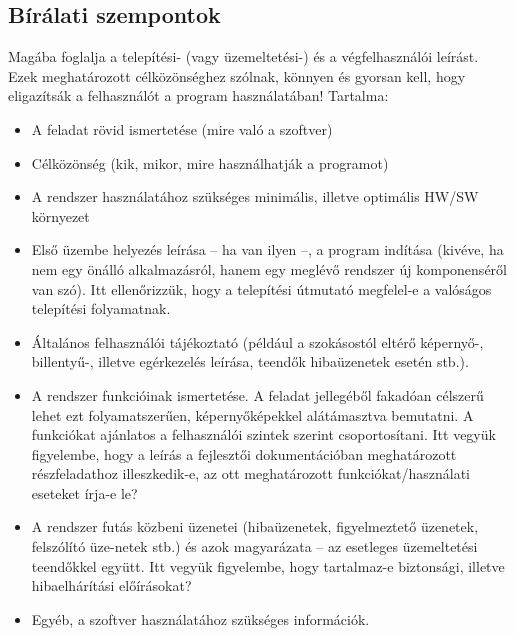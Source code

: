 \subsection{Bírálati szempontok}
Magába foglalja a telepítési- (vagy üzemeltetési-) és a végfelhasználói leírást. Ezek meghatározott célközönséghez szólnak, könnyen és gyorsan kell, hogy eligazítsák a felhasználót a program használatában!
Tartalma:
\begin{itemize}
    \item A feladat rövid ismertetése (mire való a szoftver)
	\item Célközönség (kik, mikor, mire használhatják a programot)
	\item A rendszer használatához szükséges minimális, illetve optimális HW/SW környezet
    \item Első üzembe helyezés leírása – ha van ilyen –, a program indítása (kivéve, ha nem egy önálló alkalmazásról, hanem egy meglévő rendszer új komponenséről van szó). Itt ellenőrizzük, hogy a telepítési útmutató megfelel-e a valóságos telepítési folyamatnak.
    \item Általános felhasználói tájékoztató (például a szokásostól eltérő képernyő-, billentyű-, illetve egérkezelés leírása, teendők hibaüzenetek esetén stb.).
    \item A rendszer funkcióinak ismertetése. A feladat jellegéből fakadóan célszerű lehet ezt folyamatszerűen, képernyőképekkel alátámasztva bemutatni. A funkciókat ajánlatos a felhasználói szintek szerint csoportosítani. Itt vegyük figyelembe, hogy a leírás a fejlesztői dokumentációban meghatározott részfeladathoz illeszkedik-e, az ott meghatározott funkciókat/használati eseteket írja-e le?
    \item A rendszer futás közbeni üzenetei (hibaüzenetek, figyelmeztető üzenetek, felszólító üze-netek stb.) és azok magyarázata – az esetleges üzemeltetési teendőkkel együtt. Itt vegyük figyelembe, hogy tartalmaz-e biztonsági, illetve hibaelhárítási előírásokat?
    \item Egyéb, a szoftver használatához szükséges információk.

\end{itemize}

\noindent\makebox[\linewidth]{\rule{\paperwidth}{0.4pt}}
